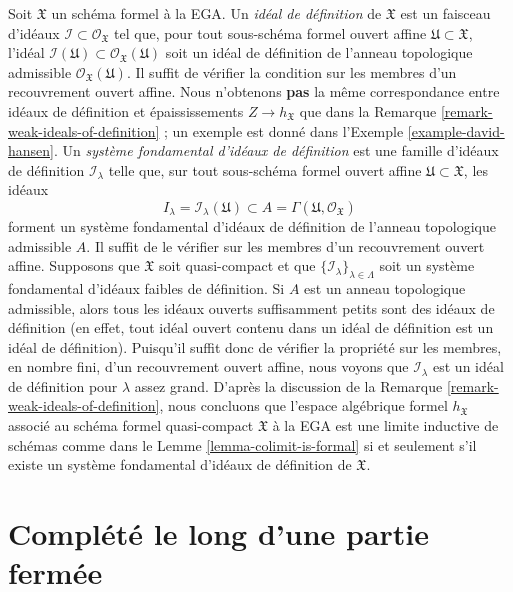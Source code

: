 \begin{remark}
\label{remark-ideals-of-definition}
Soit $\mathfrak X$ un schéma formel \`a la EGA.
Un {\it idéal de définition} de $\mathfrak X$ est un faisceau d'idéaux
$\mathcal{I} \subset \mathcal{O}_\mathfrak X$ tel que,
pour tout sous-schéma formel ouvert affine $\mathfrak U \subset \mathfrak X$,
l'idéal
$\mathcal{I}(\mathfrak U) \subset \mathcal{O}_\mathfrak X(\mathfrak U)$
soit un idéal de définition de l'anneau topologique admissible
$\mathcal{O}_\mathfrak X(\mathfrak U)$.
Il suffit de vérifier la condition sur les membres d'un recouvrement ouvert affine.
Nous n'obtenons {\bf pas} la même correspondance entre idéaux de définition
et épaississements $Z \to h_\mathfrak X$ que dans la
Remarque \ref{remark-weak-ideals-of-definition} ; un exemple
est donné dans l'Exemple \ref{example-david-hansen}.
Un {\it système fondamental d'idéaux de définition}
est une famille d'idéaux de définition
$\mathcal{I}_\lambda$ telle que, sur tout sous-schéma formel ouvert
affine $\mathfrak U \subset \mathfrak X$, les
idéaux
$$
I_\lambda = \mathcal{I}_\lambda(\mathfrak U) \subset
A = \Gamma(\mathfrak U, \mathcal{O}_\mathfrak X)
$$
forment un système fondamental d'idéaux de définition de
l'anneau topologique admissible $A$. Il suffit de le vérifier
sur les membres d'un recouvrement ouvert affine. Supposons que $\mathfrak X$
soit quasi-compact et que $\{\mathcal{I}_\lambda\}_{\lambda \in \Lambda}$
soit un système fondamental d'idéaux faibles de définition.
Si $A$ est un anneau topologique admissible, alors tous les
idéaux ouverts suffisamment petits sont des idéaux de définition
(en effet, tout idéal ouvert contenu dans un idéal de définition
est un idéal de définition). Puisqu'il suffit donc de vérifier
la propriété sur les membres, en nombre fini, d'un recouvrement ouvert affine,
nous voyons que $\mathcal{I}_\lambda$ est un idéal de définition
pour $\lambda$ assez grand. D'après la discussion de la
Remarque \ref{remark-weak-ideals-of-definition}, nous concluons que
l'espace algébrique formel $h_\mathfrak X$ associé au
schéma formel quasi-compact $\mathfrak X$ \`a la EGA
est une limite inductive de schémas comme dans le Lemme \ref{lemma-colimit-is-formal}
si et seulement s'il existe un système fondamental d'idéaux de définition
de $\mathfrak X$.
\end{remark}






\section{Complété le long d'une partie fermée}
\label{section-completion}

